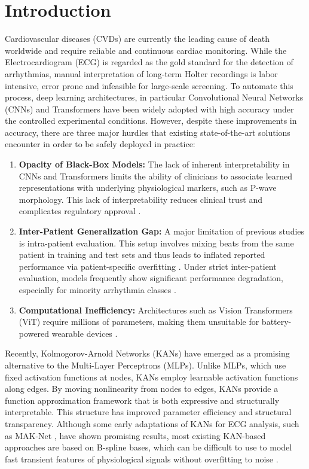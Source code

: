 \documentclass[pdflatex,sn-mathphys-num]{sn-jnl}
\theoremstyle{thmstyleone}
\theoremstyle{thmstyletwo}
\theoremstyle{thmstylethree}
\begin{document}
\section{Introduction}

Cardiovascular diseases (CVDs) are currently the leading cause of death worldwide and require reliable and continuous cardiac monitoring. While the Electrocardiogram (ECG) is regarded as the gold standard for the detection of arrhythmias, manual interpretation of long-term Holter recordings is labor intensive, error prone and infeasible for large-scale screening. To automate this process, deep learning architectures, in particular Convolutional Neural Networks (CNNs) \cite{takalo-mattila_inter-patient_2018, guo_inter-patient_2018} and Transformers \cite{akan_ecgformer_2024} have been widely adopted with high accuracy under the controlled experimental conditions. However, despite these improvements in accuracy, there are three major hurdles that existing state-of-the-art solutions encounter in order to be safely deployed in practice:

\begin{enumerate}
    \item \textbf{Opacity of Black-Box Models:} The lack of inherent interpretability in CNNs and Transformers limits the ability of clinicians to associate learned representations with underlying physiological markers, such as P-wave morphology. This lack of interpretability reduces clinical trust and complicates regulatory approval \cite{taleban_explainable_2026}.
    \item \textbf{Inter-Patient Generalization Gap:} A major limitation of previous studies is intra-patient evaluation. This setup involves mixing beats from the same patient in training and test sets and thus leads to inflated reported performance via patient-specific overfitting \cite{bahrami_investigation_2025}. Under strict inter-patient evaluation, models frequently show significant performance degradation, especially for minority arrhythmia classes \cite{xiao_deep_2023, silva_systematic_2025}.
    \item \textbf{Computational Inefficiency:} Architectures such as Vision Transformers (ViT) require millions of parameters, making them unsuitable for battery-powered wearable devices \cite{elsheikhy_lightweight_2025}.
\end{enumerate}

Recently, Kolmogorov-Arnold Networks (KANs) \cite{liu_kan_2025} have emerged as a promising alternative to the Multi-Layer Perceptrons (MLPs). Unlike MLPs, which use fixed activation functions at nodes, KANs employ learnable activation functions along edges. By moving nonlinearity from nodes to edges, KANs provide a function approximation framework that is both expressive and structurally interpretable. This structure has improved parameter efficiency and structural transparency. Although some early adaptations of KANs for ECG analysis, such as MAK-Net \cite{zhao_mak-net_2025}, have shown promising results, most existing KAN-based approaches are based on B-spline bases, which can be difficult to use to model fast transient features of physiological signals without overfitting to noise \cite{bozorgasl_liu_2024}.
\end{document}
